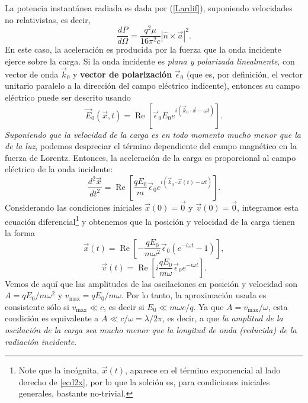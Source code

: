La potencia instantánea radiada es dada por (\ref{Lardif}), suponiendo velocidades no relativistas, es decir, 
\begin{equation}
\frac{dP}{d\Omega}=\frac{q^2\mu}{16\pi^2 c}|\hat{n}\times\vec{a}|^2.
\end{equation}
En este caso, la aceleración es producida por la fuerza que la onda incidente ejerce sobre la carga. Si la onda incidente es \textit{plana y polarizada linealmente}, con vector de onda $\vec{k}_0$ y \textbf{vector de polarización} $\vec{\epsilon}_0$ (que es, por definición, el vector unitario paralelo a la dirección del campo eléctrico indicente), entonces su campo eléctrico puede ser descrito usando
\begin{equation}
\vec{E}_0(\vec{x},t)=\operatorname{Re}\left[
\vec{\epsilon}_0E_0e^{i(\vec{k}_0\cdot\vec{x}-\omega t)}\right] .
\end{equation}
\textit{Suponiendo que la velocidad de la carga es en todo momento mucho menor que la de la luz}, podemos despreciar el término dependiente del campo magnético en la fuerza de Lorentz. Entonces, la aceleración de la carga es proporcional al campo eléctrico de la onda incidente:
\begin{equation}\label{ecd2x}
\frac{d^2\vec{x}}{dt^2}
=\operatorname{Re}\left[\frac{qE_0}{m}\vec{\epsilon}_0e^{i(\vec{k}_0\cdot\vec{x}(t)
-\omega t)}\right] .
\end{equation}
Considerando las condiciones iniciales $\vec{x}(0)=\vec{0}$ y $\vec{v}(0)=\vec{0}$, integramos esta ecuación diferencial\footnote{Note que la incógnita, $\vec{x}(t)$, aparece en el término exponencial al lado derecho de \eqref{ecd2x}, por lo que la solción es, para condiciones iniciales generales, bastante no-trivial.} y obtenemos que la posición y velocidad de la carga tienen la forma
\begin{equation}
\vec{x}(t)
=\operatorname{Re}\left[-\frac{qE_0}{m\omega^2}\vec{\epsilon}_0(e^{-i\omega t}-1)\right] ,
\end{equation}
\begin{equation}
\vec{v}(t)
=\operatorname{Re}\left[i\frac{qE_0}{m\omega}\vec{\epsilon}_0e^{-i\omega t}\right] .
\end{equation}
Vemos de aquí que las amplitudes de las oscilaciones en posición y velocidad son
$A={qE_0}/{m\omega^2}$ y $v_{\max}={qE_0}/{m\omega}$. Por lo
tanto, la aproximación usada es consistente sólo si $v_{\max}\ll c$, es decir si
$E_0\ll {m\omega c}/{q}$. Ya que $A={v_{\max}}/{\omega}$, esta condición
es equivalente a $A\ll c/\omega=\lambda/2\pi$, es decir, a que \textit{la amplitud de la oscilación de la carga sea mucho menor que la longitud de onda (reducida) de la radiación incidente}.

